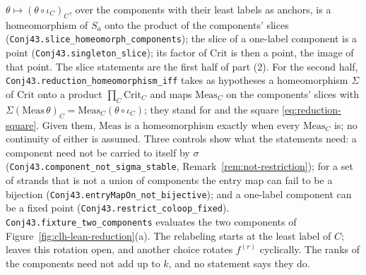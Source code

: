 \documentclass[11pt]{article}
\theoremstyle{definition}
\begin{document}
$\theta\mapsto(\theta\circ\iota_C)_C$, over the components with their least labels as anchors, is a homeomorphism of
$S_a$ onto the product of the components' slices (\texttt{Conj43.\allowbreak slice\_\allowbreak homeomorph\_\allowbreak components}); the slice of a one-label component
is a point (\texttt{Conj43.\allowbreak singleton\_\allowbreak slice}); its factor of $\mathrm{Crit}$ is then a point, the image of that point. The slice statements are the first half of part (2). For the second half,
\texttt{Conj43.\allowbreak reduction\_\allowbreak homeomorphism\_\allowbreak iff} takes as hypotheses a homeomorphism $\Sigma$ of $\mathrm{Crit}$ onto a product
$\prod_C\mathrm{Crit}_C$ and maps $\mathrm{Meas}_C$ on the components' slices with
$\Sigma(\mathrm{Meas}\,\theta)_C=\mathrm{Meas}_C(\theta\circ\iota_C)$; they stand for \cite[Prop.~4.10]{Galashin} and
the square \eqref{eq:reduction-square}. Given them, $\mathrm{Meas}$ is a homeomorphism exactly when every
$\mathrm{Meas}_C$ is; no continuity of either is assumed. Three controls show what the statements need: a component
need not be carried to itself by $\sigma$ (\texttt{Conj43.\allowbreak component\_\allowbreak not\_\allowbreak sigma\_\allowbreak stable}, Remark~\ref{rem:not-restriction}); for a
set of strands that is not a union of components the entry map can fail to be a bijection
(\texttt{Conj43.\allowbreak entryMapOn\_\allowbreak not\_\allowbreak bijective}); and a one-label component can be a fixed point (\texttt{Conj43.\allowbreak restrict\_\allowbreak coloop\_\allowbreak fixed}).
\texttt{Conj43.\allowbreak fixture\_\allowbreak two\_\allowbreak components} evaluates the two components of Figure~\ref{fig:clh-lean-reduction}(a). The relabeling
starts at the least label of $C$; \cite[\S4.4]{Galashin} leaves this rotation open, and another choice rotates
$f^{(r)}$ cyclically. The ranks of the components need not add up to $k$, and no statement says they do.
\end{document}
